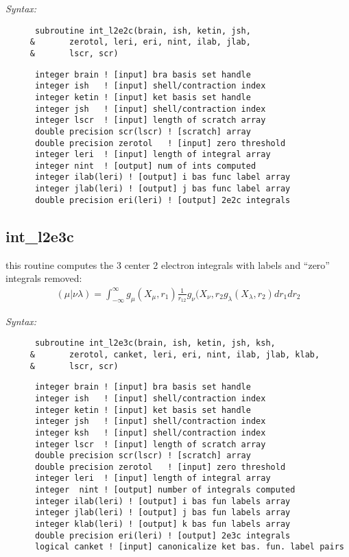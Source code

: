 {\it Syntax:} 
\begin{verbatim} 
      subroutine int_l2e2c(brain, ish, ketin, jsh,  
     &       zerotol, leri, eri, nint, ilab, jlab,  
     &       lscr, scr) 
\end{verbatim} 
\begin{verbatim} 
      integer brain ! [input] bra basis set handle 
      integer ish   ! [input] shell/contraction index 
      integer ketin ! [input] ket basis set handle 
      integer jsh   ! [input] shell/contraction index 
      integer lscr  ! [input] length of scratch array 
      double precision scr(lscr) ! [scratch] array 
      double precision zerotol   ! [input] zero threshold 
      integer leri  ! [input] length of integral array 
      integer nint  ! [output] num of ints computed 
      integer ilab(leri) ! [output] i bas func label array 
      integer jlab(leri) ! [output] j bas func label array 
      double precision eri(leri) ! [output] 2e2c integrals 
\end{verbatim} 
\subsection{int\_l2e3c} 
this routine computes the 3 center 2 electron integrals 
with labels and ``zero'' integrals removed:  
\begin{eqnarray*} 
({\mu}|{\nu}{\lambda}) = \int_{-\infty}^{\infty} g_{\mu}(X_{\mu},r_{1})\frac{1}{r_{12}} 
g_{\nu}(X_{\nu},r_{2}g_{\lambda}(X_{\lambda},r_{2})dr_{1}dr_{2} 
\end{eqnarray*} 
 
{\it Syntax:} 
\begin{verbatim} 
      subroutine int_l2e3c(brain, ish, ketin, jsh, ksh, 
     &       zerotol, canket, leri, eri, nint, ilab, jlab, klab, 
     &       lscr, scr) 
\end{verbatim} 
\begin{verbatim} 
      integer brain ! [input] bra basis set handle 
      integer ish   ! [input] shell/contraction index 
      integer ketin ! [input] ket basis set handle 
      integer jsh   ! [input] shell/contraction index 
      integer ksh   ! [input] shell/contraction index 
      integer lscr  ! [input] length of scratch array 
      double precision scr(lscr) ! [scratch] array 
      double precision zerotol   ! [input] zero threshold 
      integer leri  ! [input] length of integral array 
      integer  nint ! [output] number of integrals computed 
      integer ilab(leri) ! [output] i bas fun labels array 
      integer jlab(leri) ! [output] j bas fun labels array 
      integer klab(leri) ! [output] k bas fun labels array 
      double precision eri(leri) ! [output] 2e3c integrals 
      logical canket ! [input] canonicalize ket bas. fun. label pairs 
\end{verbatim} 
